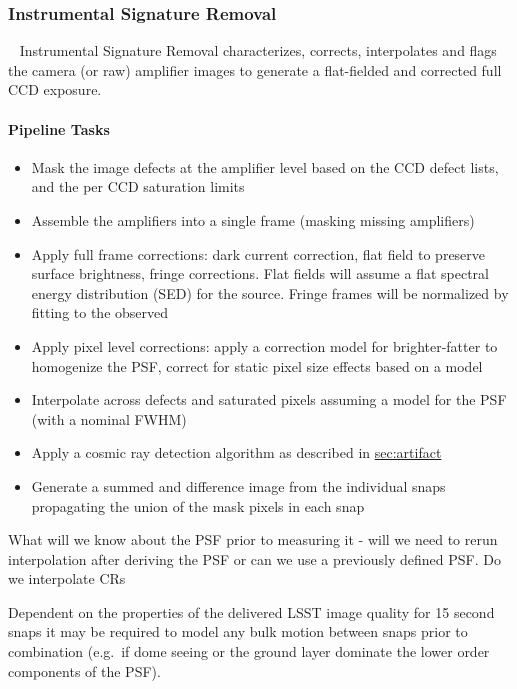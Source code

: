\subsubsection{Instrumental Signature Removal}~
\label{sec:apISR}
Instrumental Signature Removal characterizes, corrects, interpolates and flags the camera (or raw) amplifier images to generate a flat-fielded and corrected full CCD exposure.

\paragraph{Pipeline Tasks}
\begin{itemize}
\item Mask the image defects at the amplifier level based on the CCD defect lists, and the per CCD saturation limits
\item Assemble the amplifiers into a single frame (masking missing amplifiers)
\item Apply full frame corrections: dark current correction, flat field to preserve surface brightness, fringe corrections. Flat fields will assume a flat spectral energy distribution (SED) for the source. Fringe frames will be normalized by fitting to the observed 
\item Apply pixel level corrections: apply a correction model for brighter-fatter to homogenize the PSF, correct for static pixel size effects based on a model
\item Interpolate across defects and saturated pixels assuming a model for the PSF (with a nominal FWHM)
\item Apply a cosmic ray detection algorithm as described in \hyperref[sec:artifact]{sec:artifact}
\item Generate a summed and difference image from the individual snaps propagating the union of the mask pixels in each snap
\end{itemize}

\begin{note} What will we know about the PSF prior to measuring it - will we need to rerun interpolation after deriving the PSF or can we use a previously defined PSF. Do we interpolate CRs \end{note}

Dependent on the properties of the delivered LSST image quality for 15 second snaps it may be required to model any bulk motion between snaps prior to combination (e.g.\ if dome seeing or the ground layer dominate the lower order components of the PSF).


